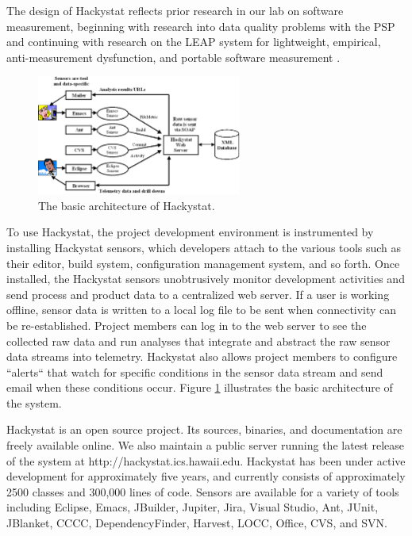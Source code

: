 The design of Hackystat \cite{csdl2-02-07} reflects prior 
research in our lab on software measurement, beginning with research into
data quality problems with the PSP \cite{csdl-98-11} and continuing with
research on the LEAP system for lightweight, empirical, anti-measurement
dysfunction, and portable software measurement \cite{csdl2-00-03}.

\begin{figure}[ht]
  \centering
  \includegraphics[width=0.60\textwidth]{architecture.eps}
  \caption{The basic architecture of Hackystat.}
  \label{fig:architecture}
\end{figure}

To use Hackystat, the project development environment is instrumented by
installing Hackystat sensors, which developers attach to the various tools
such as their editor, build system, configuration management system, and so
forth. Once installed, the Hackystat sensors unobtrusively monitor
development activities and send process and product data to a centralized
web server.  If a user is working offline, sensor data is written to a
local log file to be sent when connectivity can be re-established.  Project
members can log in to the web server to see the collected raw data and run
analyses that integrate and abstract the raw sensor data streams into
telemetry.  Hackystat also allows project members to configure ``alerts``
that watch for specific conditions in the sensor data stream and send email
when these conditions occur. Figure \ref{fig:architecture} illustrates the
basic architecture of the system.

Hackystat is an open source project. Its sources, binaries, and
documentation are freely available online.  We also maintain a public
server running the latest release of the system at
http://hackystat.ics.hawaii.edu.  Hackystat has been under active
development for approximately five years, and currently consists of
approximately 2500 classes and 300,000 lines of code.  Sensors are available
for a variety of tools including Eclipse, Emacs, JBuilder, Jupiter, Jira,
Visual Studio, Ant, JUnit, JBlanket, CCCC, DependencyFinder, Harvest, LOCC,
Office, CVS, and SVN.

